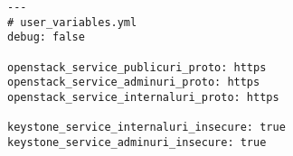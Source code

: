 \begin{verbatim}
---
# user_variables.yml
debug: false

openstack_service_publicuri_proto: https
openstack_service_adminuri_proto: https
openstack_service_internaluri_proto: https

keystone_service_internaluri_insecure: true
keystone_service_adminuri_insecure: true
\end{verbatim}
